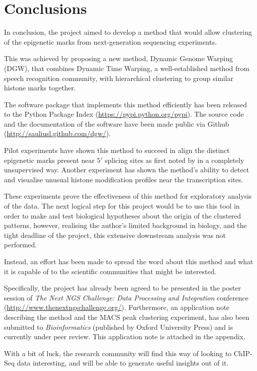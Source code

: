 \documentclass[parskip]{cs4rep}
\begin{document}
\chapter{Conclusions}
\label{cha:conclusions}

In conclusion, the project aimed to develop a method that would allow clustering of the epigenetic marks from next-generation sequencing experiments.

This was achieved by proposing a new method, Dynamic Genome Warping (DGW), that combines Dynamic Time Warping, a well-established method from speech recognition community, with hierarchical clustering to group similar histone marks together.

The software package that implements this method efficiently has been released to the Python Package Index (\url{https://pypi.python.org/pypi}). The source code and the documentation of the software have been made public via Github (\url{http://sauliusl.github.com/dgw/}).

Pilot experiments have shown this method to succeed in align the distinct epigenetic marks present near $5'$ splicing sites as first noted by \cite{Bieberstein:2012tf} in a completely unsupervised way.
Another experiment has shown the method's ability to detect and visualise unusual histone modification profiles near the transcription sites.

These experiments prove the effectiveness of this method for exploratory analysis of the data.
The next logical step for this project would be to use this tool in order to make and test biological hypotheses about the origin of the clustered patterns, 
however, realising the author's limited background in biology, and the tight deadline of the project, this extensive downstream analysis was not performed. 

Instead, an effort has been made to spread the word about this method and what it is capable of to the scientific communities that might be interested.

Specifically, the project has already been agreed to be presented in the poster session of \emph{The Next NGS Challenge: Data Processing and Integration} conference (\url{http://www.thenextngschallenge.org/}). Furthermore, an application note describing the method and the MACS peak clustering experiment, has also been submitted to \emph{Bioinformatics} (published by Oxford University Press) and is currently under peer review. This application note is attached in the appendix.

With a bit of luck, the research community will find this way of looking to ChIP-Seq data interesting, and will be able to generate useful insights out of it. 
\end{document}
